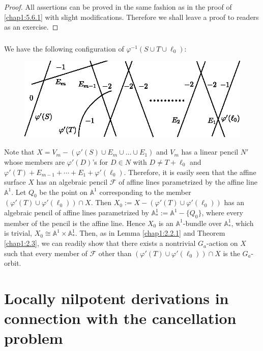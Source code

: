 \begin{proof}
All assertions can be proved in the same fashion as in the proof of
\ref{chap1:5.6.1} with slight modifications. Therefore we shall leave a
proof to readers as an exercise.
\end{proof}

\subsubsection{}\label{chap1:5.7.3}
We have the following configuration of $\varphi^{-1}(S\cup T\cup
\ell_{0})$:
\begin{figure}[H]
\centering
\includegraphics{figures/chap1-fig2.eps}
\end{figure}

Note that $X=V_{m}-(\varphi'(S)\cup E_{m}\cup\ldots\cup E_{1})$ and
$V_{m}$ has a linear pencil $N'$ whose members are $\varphi'(D)$'s for
$D\in N$ with $D\neq T+\ell_{0}$ and $\varphi'(T)+E_{m-1}+\cdots
+E_{1}+\varphi'(\ell_{0})$. Therefore, it is easily seen that the
affine surface $X$ has an algebraic pencil $\mathscr{F}$ of affine
lines parametrized by the affine line $\mathbb{A}^{1}$. Let $Q_{0}$ be
the point on $\mathbb{A}^{1}$ corresponding to the member
$(\varphi'(T)\cup \varphi'(\ell_{0}))\cap X$. Then
$X_{0}:=X-(\varphi'(T)\cup \varphi'(\ell_{0}))$ has an algebraic
pencil of affine lines parametrized by
$\mathbb{A}^{1}_{\ast}:=\mathbb{A}^{1}-\{Q_{0}\}$, where every member
of the pencil is the affine line. Hence $X_{0}$ is an
$\mathbb{A}^{1}$-bundle over $\mathbb{A}^{1}_{\ast}$, which is
trivial, \iec $X_{0}\cong \mathbb{A}^{1}\times
\mathbb{A}^{1}_{\ast}$. Then, as in Lemma \ref{chap1:2.2.1} and Theorem
\ref{chap1:2.3}, we can readily show that there exists a nontrivial
$G_{a}$-action on $X$ such that every member of $\mathscr{F}$ other
than $(\varphi'(T)\cup \varphi'(\ell_{0}))\cap X$ is the
$G_{a}$-orbit.

\section[Locally nilpotent........]{Locally nilpotent derivations in connection with the
  cancellation problem}\label{chap1:sec6}\pageoriginale\

